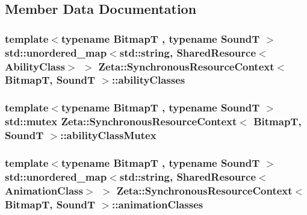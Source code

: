 \subsection{Member Data Documentation}
\hypertarget{classZeta_1_1SynchronousResourceContext_a4dd6ba3c7087214fbb1a9ee9ab5d1617}{
\subsubsection[{ability\+Classes}]{\setlength{\rightskip}{0pt plus 5cm}template$<$typename Bitmap\+T , typename Sound\+T $>$ std\+::unordered\+\_\+map$<$std\+::string, {\bf Shared\+Resource}$<${\bf Ability\+Class}$>$ $>$ {\bf Zeta\+::\+Synchronous\+Resource\+Context}$<$ Bitmap\+T, Sound\+T $>$\+::ability\+Classes\hspace{0.3cm}{\ttfamily [private]}}}\label{classZeta_1_1SynchronousResourceContext_a4dd6ba3c7087214fbb1a9ee9ab5d1617}
\hypertarget{classZeta_1_1SynchronousResourceContext_a69f971f6543a486673fa6c79cec08e52}{
\subsubsection[{ability\+Class\+Mutex}]{\setlength{\rightskip}{0pt plus 5cm}template$<$typename Bitmap\+T , typename Sound\+T $>$ std\+::mutex {\bf Zeta\+::\+Synchronous\+Resource\+Context}$<$ Bitmap\+T, Sound\+T $>$\+::ability\+Class\+Mutex\hspace{0.3cm}{\ttfamily [private]}}}\label{classZeta_1_1SynchronousResourceContext_a69f971f6543a486673fa6c79cec08e52}
\hypertarget{classZeta_1_1SynchronousResourceContext_ae7a50d651f47ae84c2b1e700ea690698}{
\subsubsection[{animation\+Classes}]{\setlength{\rightskip}{0pt plus 5cm}template$<$typename Bitmap\+T , typename Sound\+T $>$ std\+::unordered\+\_\+map$<$std\+::string, {\bf Shared\+Resource}$<${\bf Animation\+Class}$>$ $>$ {\bf Zeta\+::\+Synchronous\+Resource\+Context}$<$ Bitmap\+T, Sound\+T $>$\+::animation\+Classes\hspace{0.3cm}{\ttfamily [private]}}}\label{classZeta_1_1SynchronousResourceContext_ae7a50d651f47ae84c2b1e700ea690698}
